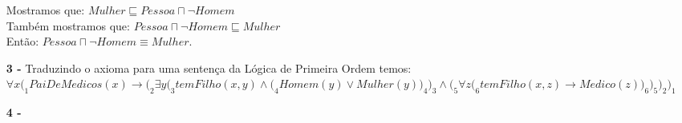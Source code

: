 \documentclass[12pt]{article}
\begin{document}
\begin{itemize}
			Mostramos que: $Mulher \sqsubseteq Pessoa \sqcap \neg Homem$\\
			Também mostramos que: $Pessoa \sqcap \neg Homem \sqsubseteq Mulher$\\
			Então: $Pessoa \sqcap \neg Homem \equiv Mulher$.
		\item[\textbf{3 -}]
			\hfill\newline
			Traduzindo o axioma para uma sentença da Lógica de Primeira Ordem temos:\\
			$\forall x\Bigg(_1 PaiDeMedicos(x) \rightarrow \bigg(_2\exists y\Big(_3temFilho(x, y) \wedge \Big(_4Homem(y) \vee Mulher(y)\Big)_4\Big)_3 \wedge \Big(_5\forall z \Big(_6temFilho(x, z) \rightarrow Medico(z)\Big)_6\Big)_5\bigg)_2\Bigg)_1$
		\item[\textbf{4 -}]
	\end{itemize}
\end{document}
